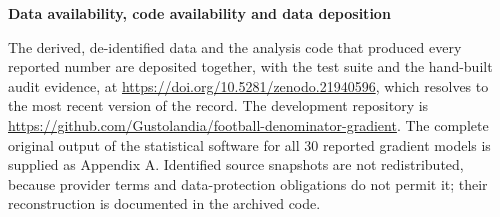 \documentclass[11pt]{article}
\begin{document}
\textbf{Data availability, code availability and data deposition}

The derived, de-identified data and the analysis code that produced every
reported number are deposited together, with the test suite and the hand-built
audit evidence, at \url{https://doi.org/10.5281/zenodo.21940596}, which
resolves to the most recent version of the record. The development repository
is \url{https://github.com/Gustolandia/football-denominator-gradient}. The
complete original output of the statistical software for all 30 reported
gradient models is supplied as Appendix A. Identified source snapshots are not
redistributed, because provider terms and data-protection obligations do not
permit it; their reconstruction is documented in the archived code.
\end{document}
